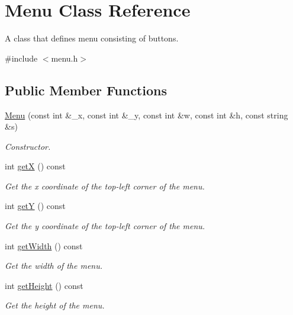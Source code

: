 \hypertarget{class_menu}{}\section{Menu Class Reference}
\label{class_menu}


A class that defines menu consisting of buttons.  




{\ttfamily \#include $<$menu.\+h$>$}

\subsection*{Public Member Functions}
\begin{DoxyCompactItemize}
\item 
\mbox{\hyperlink{class_menu_abfa6d045971efb18d5a189fdc6ee9847}{Menu}} (const int \&\+\_\+x, const int \&\+\_\+y, const int \&w, const int \&h, const string \&s)
\begin{DoxyCompactList}\small\item\em Constructor. \end{DoxyCompactList}\item 
int \mbox{\hyperlink{class_menu_a75345bb25315b3cbcc98ad276e043f4d}{getX}} () const
\begin{DoxyCompactList}\small\item\em Get the x coordinate of the top-\/left corner of the menu. \end{DoxyCompactList}\item 
int \mbox{\hyperlink{class_menu_a2daa248a3bc22bfbd0931337ea8299ae}{getY}} () const
\begin{DoxyCompactList}\small\item\em Get the y coordinate of the top-\/left corner of the menu. \end{DoxyCompactList}\item 
int \mbox{\hyperlink{class_menu_a993d925b955146c9e265d16df1371f51}{get\+Width}} () const
\begin{DoxyCompactList}\small\item\em Get the width of the menu. \end{DoxyCompactList}\item 
int \mbox{\hyperlink{class_menu_a67f414acad54c237dc321a28b6ca723a}{get\+Height}} () const
\begin{DoxyCompactList}\small\item\em Get the height of the menu. \end{DoxyCompactList}\item 

\end{DoxyCompactItemize}
